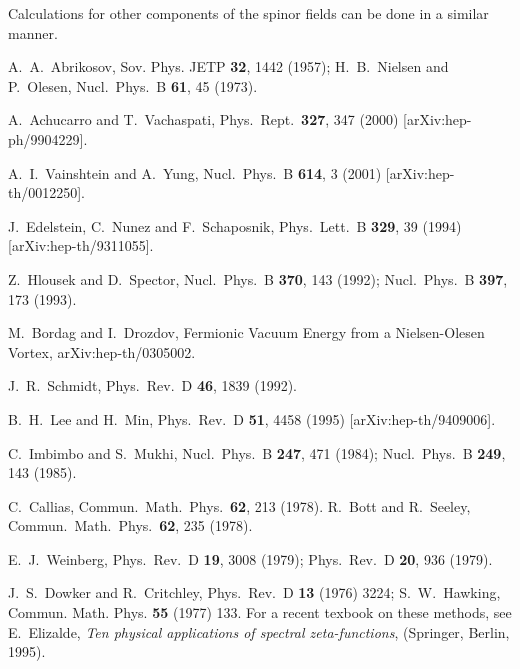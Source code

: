 \documentclass[a4paper,12pt]{article}
\begin{document}
Calculations for other components of the spinor fields can be done
in a similar manner. 
\begin{thebibliography}{99}
A.~A.~Abrikosov, Sov. Phys. JETP {\bf 32}, 1442 (1957);
H.~B.~Nielsen and P.~Olesen,
Nucl.\ Phys.\ B {\bf 61}, 45 (1973).

A.~Achucarro and T.~Vachaspati,
Phys.\ Rept.\  {\bf 327}, 347 (2000)
[arXiv:hep-ph/9904229].

A.~I.~Vainshtein and A.~Yung,
Nucl.\ Phys.\ B {\bf 614}, 3 (2001)
[arXiv:hep-th/0012250].

J.~Edelstein, C.~Nunez and F.~Schaposnik,
Phys.\ Lett.\ B {\bf 329}, 39 (1994)
[arXiv:hep-th/9311055].

Z.~Hlousek and D.~Spector,
Nucl.\ Phys.\ B {\bf 370}, 143 (1992);
Nucl.\ Phys.\ B {\bf 397}, 173 (1993).

M.~Bordag and I.~Drozdov, 
Fermionic Vacuum Energy from a Nielsen-Olesen Vortex,
arXiv:hep-th/0305002.

J.~R.~Schmidt,
Phys.\ Rev.\ D {\bf 46}, 1839 (1992).


B.~H.~Lee and H.~Min,
Phys.\ Rev.\ D {\bf 51}, 4458 (1995)
[arXiv:hep-th/9409006].

C.~Imbimbo and S.~Mukhi,
Nucl.\ Phys.\ B {\bf 247}, 471 (1984);
Nucl.\ Phys.\ B {\bf 249}, 143 (1985).

C.~Callias,
Commun.\ Math.\ Phys.\  {\bf 62}, 213 (1978).
R.~Bott and R.~Seeley,
Commun.\ Math.\ Phys.\  {\bf 62}, 235 (1978).

E.~J.~Weinberg,
Phys.\ Rev.\ D {\bf 19}, 3008 (1979);
Phys.\ Rev.\ D {\bf 20}, 936 (1979).

J.~S.~Dowker and R.~Critchley,
Phys.\ Rev.\ D {\bf 13} (1976) 3224;
S.~W.~Hawking, Commun. Math. Phys. {\bf 55} (1977) 133.
For a recent texbook on these methods, see
E.~Elizalde, {\it Ten physical applications of spectral zeta-functions},
(Springer, Berlin, 1995).


\end{thebibliography}
\end{document}
